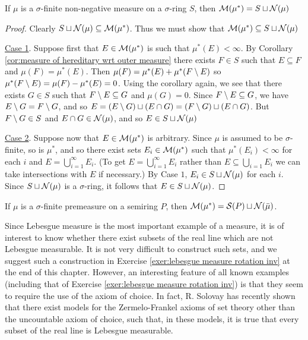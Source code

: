 \begin{theorem}\label{thm:null set completion sigma finite}
If $\mu$ is a $\sigma$-finite non-negative measure on a $\sigma$-ring $S$, then ${\cal M}(\mu^*)=S\sqcup{\cal N}(\mu)$
\end{theorem}

\begin{proof}
Clearly $S\sqcup{\cal N}(\mu)\subseteq{\cal M}(\mu^*)$. Thus we must show that ${\cal M}(\mu^*)\subseteq S\sqcup{\cal N}(\mu)$

\underline{Case 1}. Suppose first that $E\in{\cal M}(\mu^*)$ is such that $\mu^*(E)<\infty$. By Corollary \ref{cor:measure of hereditary wrt outer measure} there exists $F\in S$ such that $E\subseteq F$ and $\mu(F)=\mu^*(E)$. Then $\mu(F)=\mu^*(E)+\mu^*(F\setminus E)$ so $\mu^*(F\setminus E)=\mu(F)-\mu^*(E)=0$. Using the corollary again, we see that there exists $G\in S$ such that $F\setminus E\subseteq G$ and $\mu(G)=0$. Since $F\setminus E\subseteq G$, we have $E\setminus G=F\setminus G$, and so $E=(E\setminus G)\sqcup(E\cap G)=(F\setminus G)\sqcup(E\cap G)$. But $F\setminus G\in S$ and $E\cap G\in{\cal N}(\mu)$, and so $E\in S\sqcup{\cal N}(\mu)$

\underline{Case 2}. Suppose now that $E\in{\cal M}(\mu^*)$ is arbitrary. Since $\mu$ is assumed to be $\sigma$-finite, so is $\mu^*$, and so there exist sets $E_i\in{\cal M}(\mu^*)$ such that $\mu^*(E_i)<\infty$ for each $i$ and $E=\bigcup_{i=1}^\infty E_i$. (To get $E=\bigcup_{i=1}^\infty E_i$ rather than $E\subseteq\bigcup_{i=1}E_i$ we can take intersections with $E$ if necessary.) By Case $1$, $E_i\in S\sqcup{\cal N}(\mu)$ for each $i$. Since $S\sqcup{\cal N}(\mu)$ is a $\sigma$-ring, it follows that $E\in S\sqcup{\cal N}(\mu)$.
\end{proof}

\begin{corollary}
If $\mu$ is a $\sigma$-finite premeasure on a semiring $P$, then ${\cal M}(\mu^*)={\cal S}(P)\sqcup{\cal N}(\bar{\mu})$.
\end{corollary}

Since Lebesgue measure is the most important example of a measure, it is of interest to know whether there exist subsets of the real line which are not Lebesgue measurable. It is not very difficult to construct such sets, and we suggest such a construction in Exercise \ref{exer:lebesgue measure rotation inv} at the end of this chapter. However, an interesting feature of all known examples (including that of Exercise \ref{exer:lebesgue measure rotation inv}) is that they seem to require the use of the axiom of choice. In fact, R. Solovay has recently shown that there exist models for the Zermelo-Frankel axioms of set theory other than the uncountable axiom of choice, such that, in these models, it is true that every subset of the real line is Lebesgue measurable.


